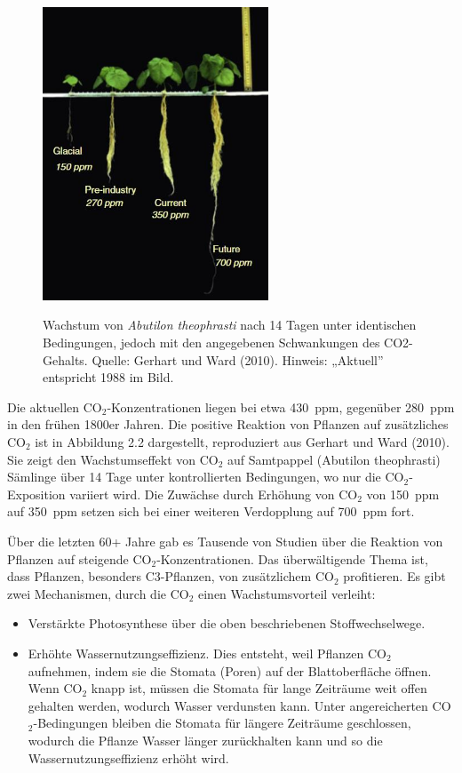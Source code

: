 \documentclass[12pt,paper=a4,DIV=12,parskip=never,chapterprefix=false,headings=standardclasses]{scrreprt}
\numberwithin{figure}{chapter}
\begin{document}
\begin{figure}[H]
\begin{center}
\includegraphics[width=0.6\textwidth]{bilder/bilderKlima-0003.jpg}\\[1cm]
\end{center}
\caption{Wachstum von \emph{Abutilon theophrasti} nach 14 Tagen unter identischen Bedingungen, jedoch mit den
angegebenen Schwankungen des CO2-Gehalts. Quelle: Gerhart und Ward (2010). Hinweis: „Aktuell” entspricht
1988 im Bild.}
\end{figure}

Die aktuellen CO$_2$-Konzentrationen liegen bei etwa \SI{430}{ppm}, gegenüber \SI{280}{ppm} in den frühen 1800er Jahren. Die positive Reaktion von Pflanzen auf zusätzliches CO$_2$ ist in Abbildung 2.2 dargestellt, reproduziert aus Gerhart und Ward (2010). Sie zeigt den Wachstumseffekt von CO$_2$ auf Samtpappel (Abutilon theophrasti) Sämlinge über 14 Tage unter kontrollierten Bedingungen, wo nur die CO$_2$-Exposition variiert wird. Die Zuwächse durch Erhöhung von CO$_2$ von \SI{150}{ppm} auf \SI{350}{ppm} setzen sich bei einer weiteren Verdopplung auf \SI{700}{ppm} fort.

Über die letzten 60+ Jahre gab es Tausende von Studien über die Reaktion von Pflanzen auf steigende CO$_2$-Konzentrationen. Das überwältigende Thema ist, dass Pflanzen, besonders C3-Pflanzen, von zusätzlichem CO$_2$ profitieren. Es gibt zwei Mechanismen, durch die CO$_2$ einen Wachstumsvorteil verleiht:

\begin{itemize}
\item Verstärkte Photosynthese über die oben beschriebenen Stoffwechselwege.
\item Erhöhte Wassernutzungseffizienz. Dies entsteht, weil Pflanzen CO$_2$ aufnehmen, indem sie die Stomata (Poren) auf der Blattoberfläche öffnen. Wenn CO$_2$ knapp ist, müssen die Stomata für lange Zeiträume weit offen gehalten werden, wodurch Wasser verdunsten kann. Unter angereicherten CO$_2$-Bedingungen bleiben die Stomata für längere Zeiträume geschlossen, wodurch die Pflanze Wasser länger zurückhalten kann und so die Wassernutzungseffizienz erhöht wird.
\end{itemize}
\end{document}
